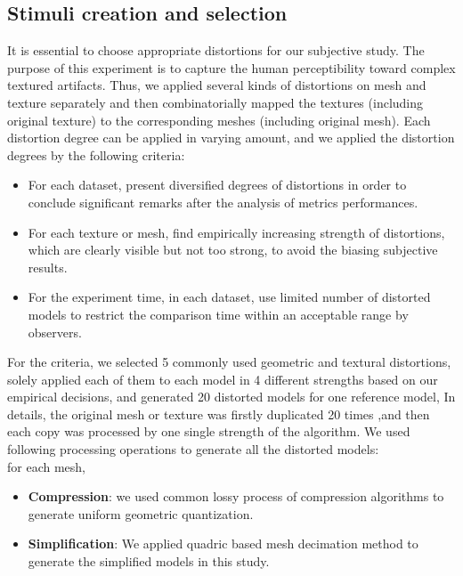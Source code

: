 \subsection{Stimuli creation and selection}
It is essential to choose appropriate distortions for our subjective study.  The purpose of this experiment is to capture the human perceptibility toward complex textured artifacts. Thus, we applied several kinds of distortions on mesh and texture separately and then combinatorially mapped the textures (including original texture) to the corresponding meshes (including original mesh). Each distortion degree can be applied in varying amount, and we applied the distortion degrees by the following criteria: \\
\begin{itemize}
\item For each dataset, present diversified degrees of distortions in order to conclude significant remarks after the analysis of metrics performances. 
\end{itemize}
\begin{itemize}
\item For each texture or mesh, find empirically increasing strength of distortions, which are clearly visible but not too strong, to avoid the biasing subjective results.
\end{itemize}
\begin{itemize}
\item For the experiment time, in each dataset, use limited number of distorted models to restrict the comparison time within an acceptable range by observers. 
\end{itemize}
For the criteria, we selected 5 commonly used geometric and textural distortions, solely applied each of them to each model in 4 different strengths based on our empirical decisions, and generated 20 distorted models for one reference model, In details, the original mesh or texture was firstly duplicated 20 times ,and then each copy was processed by one single strength of the algorithm. We used following processing operations to generate all the distorted models:\\
for each mesh,
\begin{itemize}
\item \textbf{Compression}:  we used common lossy process of  compression algorithms to generate uniform geometric quantization.
\end{itemize}
\begin{itemize}
\item  \textbf{Simplification}: We applied quadric based mesh decimation method \cite{Garland_1997} to generate the simplified models in this study.
\end{itemize}
